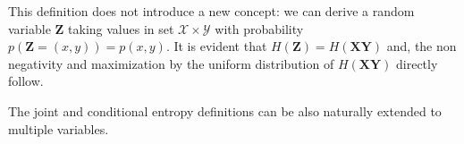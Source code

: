 This definition does not introduce a new concept: we can derive a random variable $\mathbf{Z}$ taking values in set $\mathcal{X}\times\mathcal{Y}$ with probability $p(\mathbf{Z}=(x,y))=p(x,y)$. It is evident that $H(\mathbf{Z})=H(\mathbf{X}\mathbf{Y})$ and, the non negativity and maximization by the uniform distribution of $H(\mathbf{X}\mathbf{Y})$ directly follow. 


The joint and conditional entropy definitions can be also naturally extended to multiple variables. %

